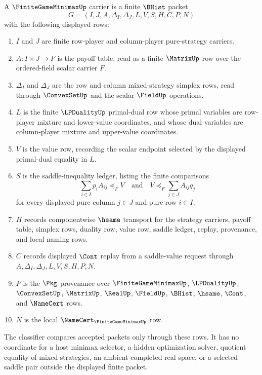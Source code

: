 \begin{definition}
\label{def:finite-game-minimax-carrier}
A $\FiniteGameMinimaxUp$ carrier is a finite $\BHist$ packet
$$
G=(I,J,A,\Delta_I,\Delta_J,L,V,S,H,C,P,N)
$$
with the following displayed rows:
\begin{enumerate}
\item $I$ and $J$ are finite row-player and column-player pure-strategy carriers.
\item $A:I\times J\to F$ is the payoff table, read as a finite $\MatrixUp$ row over the ordered-field scalar carrier $F$.
\item $\Delta_I$ and $\Delta_J$ are the row and column mixed-strategy simplex rows, read through $\ConvexSetUp$ and the scalar $\FieldUp$ operations.
\item $L$ is the finite $\LPDualityUp$ primal-dual row whose primal variables are row-player mixture and lower-value coordinates, and whose dual variables are column-player mixture and upper-value coordinates.
\item $V$ is the value row, recording the scalar endpoint selected by the displayed primal-dual equality in $L$.
\item $S$ is the saddle-inequality ledger, listing the finite comparisons
$$
\sum_{i\in I}p_iA_{ij}\preceq_F V
\quad\text{and}\quad
V\preceq_F\sum_{j\in J}A_{ij}q_j
$$
for every displayed pure column $j\in J$ and pure row $i\in I$.
\item $H$ records componentwise $\hsame$ transport for the strategy carriers, payoff table, simplex rows, duality row, value row, saddle ledger, replay, provenance, and local naming rows.
\item $C$ records displayed $\Cont$ replay from a saddle-value request through $A,\Delta_I,\Delta_J,L,V,S,H,P,N$.
\item $P$ is the $\Pkg$ provenance over $\FiniteGameMinimaxUp$, $\LPDualityUp$, $\ConvexSetUp$, $\MatrixUp$, $\RealUp$, $\FieldUp$, $\BHist$, $\hsame$, $\Cont$, and $\NameCert$ rows.
\item $N$ is the local $\NameCert_{\FiniteGameMinimaxUp}$ row.
\end{enumerate}
The classifier compares accepted packets only through these rows. It has no coordinate for a host minimax selector, a hidden optimization solver, quotient equality of mixed strategies, an ambient completed real space, or a selected saddle pair outside the displayed finite packet.
\end{definition}

